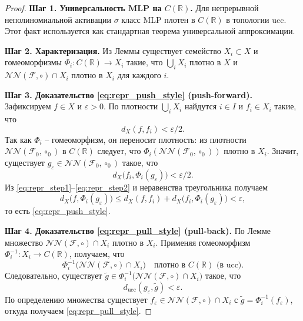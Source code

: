 \documentclass[../NDCNNAI_main.tex]{subfiles}
\begin{document}
\begin{proof}
\noindent\textbf{Шаг 1. Универсальность MLP на $C(\mathbb{R})$.}
Для непрерывной неполиномиальной активации $\sigma$ класс MLP плотен в $C(\mathbb{R})$ в топологии ucc.
Этот факт используется как стандартная теорема универсальной аппроксимации.

\noindent\textbf{Шаг 2. Характеризация.}
Из Леммы существует семейство $X_i\subset X$ и гомеоморфизмы
$\Phi_i:C(\mathbb{R})\to X_i$ такие, что $\bigcup_i X_i$ плотно в $X$ и
$\mathcal{NN}(\mathcal{F},\circ)\cap X_i$ плотно в $X_i$ для каждого $i$.

\noindent\textbf{Шаг 3. Доказательство \eqref{eq:repr_push_style} (push-forward).}
Зафиксируем $f\in X$ и $\varepsilon>0$.
По плотности $\bigcup_i X_i$ найдутся $i\in I$ и $f_i\in X_i$ такие, что
\begin{equation}\label{eq:repr_step1}
d_X(f,f_i)<\varepsilon/2.
\end{equation}
Так как $\Phi_i$ -- гомеоморфизм, он переносит плотность:
из плотности $\mathcal{NN}(\mathcal{F}_0,\circ_0)$ в $C(\mathbb{R})$ следует, что
$\Phi_i(\mathcal{NN}(\mathcal{F}_0,\circ_0))$ плотно в $X_i$.
Значит, существует $g_\varepsilon\in \mathcal{NN}(\mathcal{F}_0,\circ_0)$ такое, что
\begin{equation}\label{eq:repr_step2}
d_X\bigl(f_i,\Phi_i(g_\varepsilon)\bigr)<\varepsilon/2.
\end{equation}
Из \eqref{eq:repr_step1}--\eqref{eq:repr_step2} и неравенства треугольника получаем
\[
d_X\bigl(f,\Phi_i(g_\varepsilon)\bigr)\le d_X(f,f_i)+d_X\bigl(f_i,\Phi_i(g_\varepsilon)\bigr)<\varepsilon,
\]
то есть \eqref{eq:repr_push_style}.

\noindent\textbf{Шаг 4. Доказательство \eqref{eq:repr_pull_style} (pull-back).}
По Лемме множество $\mathcal{NN}(\mathcal{F},\circ)\cap X_i$ плотно в $X_i$.
Применяя гомеоморфизм $\Phi_i^{-1}\colon X_i\to C(\mathbb{R})$, получаем, что
\[
\Phi_i^{-1}\bigl(\mathcal{NN}(\mathcal{F},\circ)\cap X_i\bigr)
\quad\text{плотно в } C(\mathbb{R}) \text{ (в ucc)}.
\]
Следовательно, существует $\tilde g\in \Phi_i^{-1}\bigl(\mathcal{NN}(\mathcal{F},\circ)\cap X_i\bigr)$ такое, что
\[
d_{\mathrm{ucc}}(g_\varepsilon,\tilde g)<\varepsilon.
\]
По определению множества существует $f_\varepsilon\in \mathcal{NN}(\mathcal{F},\circ)\cap X_i$ с
$\tilde g=\Phi_i^{-1}(f_\varepsilon)$, откуда получаем \eqref{eq:repr_pull_style}.
\end{proof}
\end{document}
